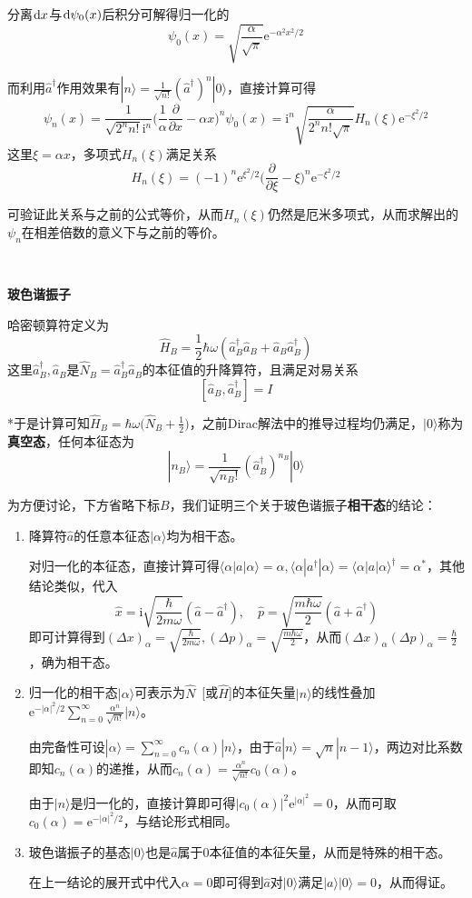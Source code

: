 \documentclass[a4paper,UTF8,fontset=windows]{ctexart}
\newcommand*{\dr}{\hspace{0.07em}\mathrm{d}}
\newcommand*{\ir}{\mathrm{i}}
\newcommand*{\er}{\mathrm{e}}
\newcommand*{\ket}[1]{|#1\rangle}
\newcommand*{\blk}[3]{\langle#1|#2|#3\rangle}
\begin{document}
分离$\dr x$与$\dr\psi_0(x)$后积分可解得归一化的
$$\psi_0(x)=\sqrt{\frac{\alpha}{\sqrt{\pi}}}\er^{-\alpha^2x^2/2}$$

而利用$\hat{a}^\dagger$作用效果有$\ket{n}=\frac{1}{\sqrt{n!}}(\hat{a}^\dagger)^n\ket{0}$，直接计算可得
$$\psi_n(x)=\frac{1}{\sqrt{2^nn!}\ir^n}\bigg(\frac{1}{\alpha}\frac{\partial}{\partial x}-\alpha x\bigg)^n\psi_0(x)=\ir^n\sqrt{\frac{\alpha}{2^nn!\sqrt{\pi}}}H_n(\xi)\er^{-\xi^2/2}$$
这里$\xi=\alpha x$，多项式$H_n(\xi)$满足关系
$$H_n(\xi)=(-1)^n\er^{\xi^2/2}\bigg(\frac{\partial}{\partial\xi}-\xi\bigg)^n\er^{-\xi^2/2}$$

可验证此关系与之前的公式等价，从而$H_n(\xi)$仍然是厄米多项式，从而求解出的$\psi_n$在相差倍数的意义下与之前的等价。

\

\textbf{玻色谐振子}

哈密顿算符定义为
$$\hat{H}_B=\frac{1}{2}\hbar\omega(\hat{a}_B^\dagger\hat{a}_B+\hat{a}_B\hat{a}_B^\dagger)$$
这里$\hat{a}_B^\dagger,\hat{a}_B$是$\hat{N}_B=\hat{a}_B^\dagger\hat{a}_B$的本征值的升降算符，且满足对易关系
$$[\hat{a}_B,\hat{a}_B^\dagger]=I$$

*于是计算可知$\hat{H}_B=\hbar\omega\big(\hat{N}_B+\frac{1}{2}\big)$，之前Dirac解法中的推导过程均仍满足，$\ket{0}$称为\textbf{真空态}，任何本征态为
$$\ket{n_B}=\frac{1}{\sqrt{n_B!}}(\hat{a}_B^\dagger)^{n_B}\ket{0}$$

为方便讨论，下方省略下标$B$，我们证明三个关于玻色谐振子\textbf{相干态}的结论：
\begin{enumerate}
    \item 降算符$\hat{a}$的任意本征态$\ket{\alpha}$均为相干态。
    
    对归一化的本征态，直接计算可得$\blk{\alpha}{a}{\alpha}=\alpha,\blk{\alpha}{a^\dagger}{\alpha}=\blk{\alpha}{a}{\alpha}^\dagger=\alpha^*$，其他结论类似，代入
    $$\hat{x}=\ir\sqrt{\frac{\hbar}{2m\omega}}(\hat{a}-\hat{a}^\dagger),\quad\hat{p}=\sqrt{\frac{m\hbar\omega}{2}}(\hat{a}+\hat{a}^\dagger)$$
    即可计算得到$(\Delta x)_\alpha=\sqrt{\frac{\hbar}{2m\omega}},(\Delta p)_\alpha=\sqrt{\frac{m\hbar\omega}{2}}$，从而$(\Delta x)_\alpha(\Delta p)_\alpha=\frac{\hbar}{2}$，确为相干态。

    \item 归一化的相干态$\ket{\alpha}$可表示为$\hat{N}$\ [或$\hat{H}$]的本征矢量$\ket{n}$的线性叠加$\er^{-|\alpha|^2/2}\sum_{n=0}^\infty\frac{\alpha^n}{\sqrt{n!}}\ket{n}$。
    
    由完备性可设$\ket{\alpha}=\sum_{n=0}^\infty c_n(\alpha)\ket{n}$，由于$\hat{a}\ket{n}=\sqrt{n}\ket{n-1}$，两边对比系数即知$c_n(\alpha)$的递推，从而$c_n(\alpha)=\frac{\alpha^n}{\sqrt{n!}}c_0(\alpha)$。

    由于$\ket{n}$是归一化的，直接计算即可得$|c_0(\alpha)|^2\er^{|\alpha|^2}=0$，从而可取$c_0(\alpha)=\er^{-|\alpha|^2/2}$，与结论形式相同。

    \item 玻色谐振子的基态$\ket{0}$也是$\hat{a}$属于0本征值的本征矢量，从而是特殊的相干态。
    
    在上一结论的展开式中代入$\alpha=0$即可得到$\hat{a}$对$\ket{0}$满足$\ket{a}\ket{0}=0$，从而得证。

\end{enumerate}
\end{document}
